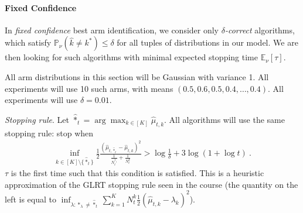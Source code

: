 \begin{questions}

\end{questions}

\paragraph{Fixed Confidence}
\label{par:fixed_confidence}

In \emph{fixed confidence} best arm identification, we consider only \emph{$\delta$-correct} algorithms, which satisfy $\mathbb{P}_\nu(\hat{k} \ne k^*) \le \delta$ for all tuples of distributions in our model. We are then looking for such algorithms with minimal expected stopping time $\mathbb{E}_\nu[\tau]$.

All arm distributions in this section will be Gaussian with variance 1. All experiments will use 10 such arms, with means $(0.5, 0.6, 0.5, 0.4, \ldots, 0.4)$. All experiments will use $\delta = 0.01$.

\emph{Stopping rule}. Let $\hat{*}_t = \arg\max_{k \in [K]} \hat{\mu}_{t,k}$. All algorithms will use the same stopping rule: stop when
\begin{align*}
\inf_{k \in [K] \setminus \{\hat{*}_t\}} \frac{1}{2} \frac{(\hat{\mu}_{t,\hat{*}_t} - \hat{\mu}_{t,k})^2}{\frac{1}{N_t^{\hat{*}_t}}+\frac{1}{N_t^k}}
> \log \frac{1}{\delta} + 3 \log (1 + \log t) \: .
\end{align*}
$\tau$ is the first time such that this condition is satisfied.
This is a heuristic approximation of the GLRT stopping rule seen in the course (the quantity on the left is equal to $\inf_{\lambda : *_\lambda \ne \hat{*}_t} \sum_{k=1}^K N_t^k \frac{1}{2}(\hat{\mu}_{t,k} -\lambda_{k})^2$).

